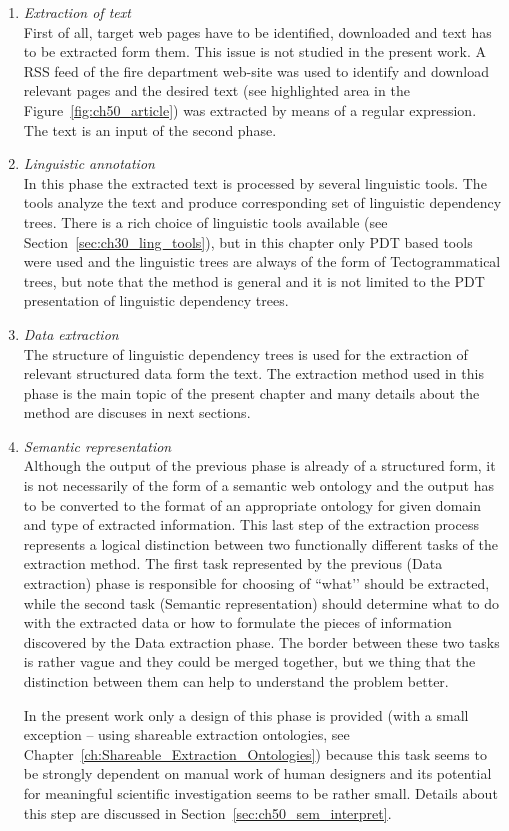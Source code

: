 \begin{enumerate}
\item \emph{Extraction of text} \\ First of all, target web pages have to be identified, downloaded and text has to be extracted form them. This issue is not studied in the present work. A RSS feed of the fire department web-site was used to identify and download relevant pages and the desired text (see highlighted area in the Figure~\ref{fig:ch50_article}) was extracted by means of a regular expression. The text is an input of the second phase.

\item \emph{Linguistic annotation} \\ In this phase the extracted text is processed by several linguistic tools. The tools analyze the text and produce corresponding set of linguistic dependency trees. There is a rich choice of linguistic tools available (see Section~\ref{sec:ch30_ling_tools}), but in this chapter only PDT based tools were used and the linguistic trees are always of the form of Tectogrammatical trees, but note that the method is general and it is not limited to the PDT presentation of linguistic dependency trees.

\item \emph{Data extraction} \\ The structure of linguistic dependency trees is used for the extraction of relevant structured data form the text. The extraction method used in this phase is the main topic of the present chapter and many details about the method are discuses in next sections.

\item \emph{Semantic representation} \\ Although the output of the previous phase is already of a structured form, it is not necessarily of the form of a semantic web ontology and the output has to be converted to the format of an appropriate ontology for given domain and type of extracted information. This last step of the extraction process represents a logical distinction between two functionally different tasks of the extraction method. The first task represented by the previous (Data extraction) phase is responsible for choosing of ``what’’ should be extracted, while the second task (Semantic representation) should determine what to do with the extracted data or how to formulate the pieces of information discovered by the Data extraction phase. The border between these two tasks is rather vague and they could be merged together, but we thing that the distinction between them can help to understand the problem better.


In the present work only a design of this phase is provided (with a small exception -- using shareable extraction ontologies, see Chapter~\ref{ch:Shareable_Extraction_Ontologies}) because this task seems to be strongly dependent on manual work of human designers and its potential for meaningful scientific investigation seems to be rather small. Details about this step are discussed in Section~\ref{sec:ch50_sem_interpret}.
\end{enumerate}



